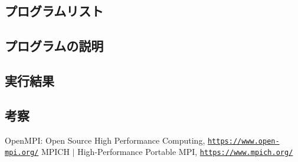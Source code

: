 \documentclass[a4j,titlepage]{jsarticle}
\begin{document}
\subsection{プログラムリスト}

\subsection{プログラムの説明}

\subsection{実行結果}

\subsection{考察}



\begin{thebibliography}{9}
   OpenMPI: Open Source High Performance Computing, \texttt{\url{https://www.open-mpi.org/}}
   MPICH $|$ High-Performance Portable MPI, \texttt{\url{https://www.mpich.org/}}
\end{thebibliography}
\end{document}
